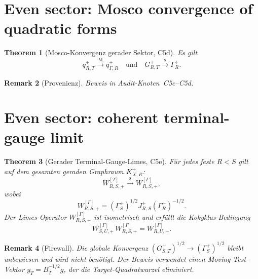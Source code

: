 \documentclass[12pt,a4paper]{amsart}
\newtheorem{theorem}{Theorem}[section]
\newtheorem{remark}[theorem]{Remark}
\newcommand{\KXRp}{K_{X,R}^{+}}
\newcommand{\JRSp}{J_{R,S}^{+}}
\newcommand{\GRTp}{G_{R,T}^{+}}
\newcommand{\GammaRp}{\Gamma_R^{+}}
\newcommand{\qRTp}{q_{R,T}^{+}}
\newcommand{\qGammaR}{q_{\Gamma,R}^{+}}
\newcommand{\WRST}[1]{W_{R,S,#1}^{[T]}}
\newcommand{\WRSGamma}[1]{W_{R,S,#1}^{[\Gamma]}}
\newcommand{\Mosco}{\xrightarrow{\mathrm{M}}}
\newcommand{\sconv}{\xrightarrow{\mathrm{s}}}
\begin{document}
\section{Even sector: Mosco convergence of quadratic forms}
\label{sec:even-mosco}


\begin{theorem}[Mosco-Konvergenz gerader Sektor, C5d]
  \label{thm:mosco-even}
  Es gilt
  \[
    \qRTp \Mosco \qGammaR
    \quad \text{und} \quad
    \GRTp \sconv \GammaRp.
  \]
\end{theorem}

\begin{remark}[Provenienz]
  Beweis in Audit-Knoten~C5c--C5d.
\end{remark}

\section{Even sector: coherent terminal-gauge limit}
\label{sec:even-terminal}


\begin{theorem}[Gerader Terminal-Gauge-Limes, C5e]
  \label{thm:even-terminal}
  Für jedes feste $R < S$ gilt auf dem gesamten geraden Graphraum
  $\KXRp$:
  \[
    \WRST{+} \sconv \WRSGamma{+},
  \]
  wobei
  \[
    \WRSGamma{+} = (\Gamma_S^+)^{1/2} \JRSp (\GammaRp)^{-1/2}.
  \]
  Der Limes-Operator $\WRSGamma{+}$ ist isometrisch und
  erfüllt die Kokyklus-Bedingung
  \[
    W_{S,U,+}^{[\Gamma]} \, W_{R,S,+}^{[\Gamma]} = W_{R,U,+}^{[\Gamma]}.
  \]
\end{theorem}

\begin{remark}[Firewall]
  Die globale Konvergenz $(G_{S,T}^+)^{1/2} \to (\Gamma_S^+)^{1/2}$
  bleibt unbewiesen und wird nicht benötigt.
  Der Beweis verwendet einen Moving-Test-Vektor
  $y_T = B_T^{-1/2} g$, der die Target-Quadratwurzel eliminiert.
\end{remark}
\end{document}
